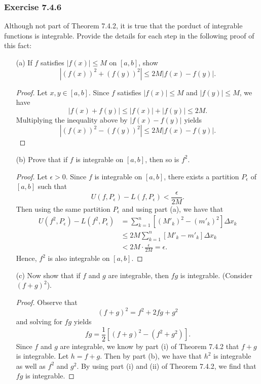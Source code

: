 \subsubsection{Exercise 7.4.6} Although not part of Theorem 7.4.2, it is true that the porduct of integrable functions is integrable. Provide the details for each step in the following proof of this fact:
\begin{enumerate}
	\item[(a)] If \( f  \) satisfies \( | f(x)  | \leq M  \) on \( [a,b]  \), show 
		\[  | (f(x))^{2} + (f(y))^{2} |  \leq 2M | f(x) - f(y) |. \]
		\begin{proof}
			Let \( x,y \in [a,b]  \). Since \( f  \) satisfies \( | f(x)  | \leq M  \) and \( | f(y) | \leq M  \), we have 
			\[  | f(x) + f(y)  | \leq | f(x)  | + | f(y)  | \leq 2M. \]
	Multiplying the inequality above by \( | f(x) - f(y)  |  \) yields 
	\[  | (f(x))^{2} - (f(y))^{2} | \leq 2M | f(x) - f(y) |. \]
		\end{proof}
	\item[(b)] Prove that if \( f  \) is integrable on \( [a,b]  \), then so is \( f^{2} \). 
		\begin{proof}
			Let \( \epsilon > 0 \). Since \( f  \) is integrable on \( [a,b]  \), there exists a partition \( P_{\epsilon } \) of \( [a,b] \) such that 
			\[ U(f, P_{\epsilon }) - L(f, P_{\epsilon }) < \frac{ \epsilon  }{ 2M }. \]
			Then using the same partition \( P_{\epsilon } \) and using part (a), we have that  
			\begin{align*}
				U(f^{2}, P_{\epsilon }) - L(f^{2}, P_{\epsilon }) &= \sum_{ k=1 }^{ n } [ (M'_{k})^{2} - (m'_{k })^{2}] \Delta x_{k } \\
																  &\leq 2M \sum_{ k=1 }^{ n } [M'_{k } - m'_{k}] \Delta x_{k } \\
																  &< 2M \cdot \frac{ \epsilon  }{ 2M } = \epsilon. 
			\end{align*}
			Hence, \( f^{2} \) is also integrable on \( [a,b]  \).
		\end{proof}
	\item[(c)] Now show that if \( f  \) and \( g \) are integrable, then \( fg \) is integrable. (Consider \( (f+g)^{2} \)).
		\begin{proof}
		Observe that 
		\[  (f+g)^{2} = f^{2} + 2fg + g^{2} \]
		and solving for \( fg \) yields 
		\[  fg = \frac{ 1 }{ 2 }  [ (f+g)^{2} - (f^2 + g^{2})]. \]
		Since \( f  \) and \( g  \) are integrable, we know by part (i) of Theorem 7.4.2 that \( f + g  \) is integrable.  Let \( h = f +g   \). Then by part (b), we have that \( h^{2} \) is integrable as well as \( f^{2} \) and \( g^{2} \). By using part (i) and (ii) of Theorem 7.4.2, we find that \( fg \) is integrable. 
		\end{proof}
\end{enumerate}

